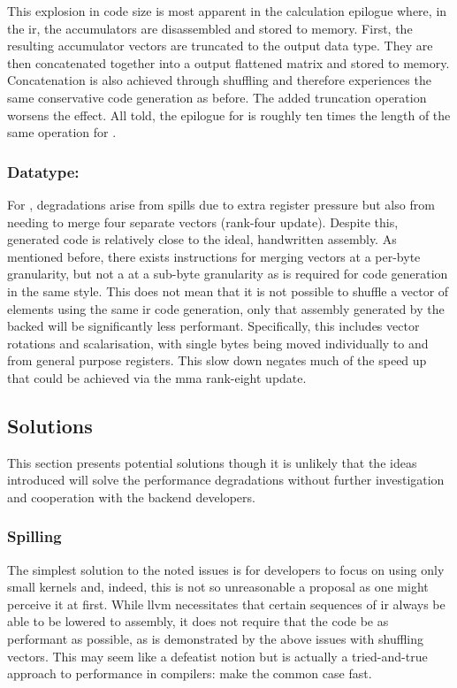 \documentclass[\main/thesis.tex]{subfiles}
\begin{document}
This explosion in code size is most apparent in the calculation epilogue where, in the \gls{ir}, the accumulators are disassembled and stored to memory.
First, the resulting accumulator vectors are truncated to the output data type.
They are then concatenated together into a output flattened matrix and stored to memory.
Concatenation is also achieved through shuffling and therefore experiences the same conservative code generation as before.
The added truncation operation worsens the effect.
All told, the epilogue for  is roughly ten times the length of the same operation for .

\subsubsection{Datatype: \texorpdfstring{}{i4}}
For , degradations arise from \glspl{spill} due to extra register pressure but also from needing to merge four separate vectors (rank-four update).
Despite this, generated code is relatively close to the ideal, handwritten assembly.
As mentioned before, there exists instructions for merging vectors at a per-byte granularity, but not a at a sub-byte granularity as is required for  code generation in the same style.
This does not mean that it is not possible to shuffle a vector of  elements using the same \gls{ir} code generation, only that assembly generated by the backed will be significantly less performant.
Specifically, this includes vector rotations and scalarisation, with single bytes being moved individually to and from general purpose registers.
This slow down negates much of the speed up that could be achieved via the \gls{mma} rank-eight update.

\subsection{Solutions}
This section presents potential solutions though it is unlikely that the ideas introduced will solve the performance degradations without further investigation and cooperation with the backend developers.

\subsubsection{Spilling}
\label{sec:spillSolution}
The simplest solution to the noted  issues is for developers to focus on using only small kernels and, indeed, this is not so unreasonable a proposal as one might perceive it at first.
While \gls{llvm} necessitates that certain sequences of \gls{ir} always be able to be lowered to assembly, it does not require that the code be as performant as possible, as is demonstrated by the above issues with shuffling  vectors.
This may seem like a defeatist notion but is actually a tried-and-true approach to performance in compilers: make the common case fast.
\end{document}
